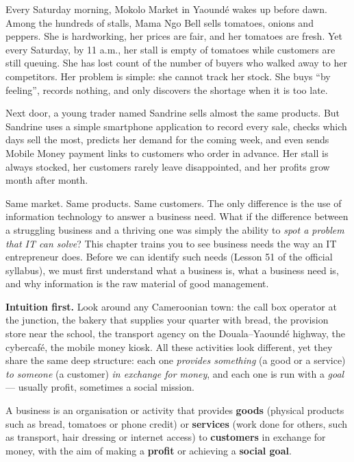 \documentclass[11pt]{article}
\newcommand{\cle}[1]{{\popxbold\color{popdark}#1}}
\newcounter{popsec}
\newcounter{popsub}
\newcommand{\courssub}[1]{%
  \stepcounter{popsub}%
  \par\vspace{9pt}\noindent{\popxbold\fontsize{11.5}{13}\selectfont\color{popink}{\color{poporange}\thepopsec.\thepopsub}\hspace{6pt}#1}\par\nopagebreak\vspace{4pt}
}
\begin{document}
Every Saturday morning, Mokolo Market in Yaoundé wakes up before dawn. Among the hundreds of stalls, Mama Ngo Bell sells tomatoes, onions and peppers. She is hardworking, her prices are fair, and her tomatoes are fresh. Yet every Saturday, by 11 a.m., her stall is empty of tomatoes while customers are still queuing. She has lost count of the number of buyers who walked away to her competitors. Her problem is simple: she cannot track her stock. She buys ``by feeling'', records nothing, and only discovers the shortage when it is too late.

Next door, a young trader named Sandrine sells almost the same products. But Sandrine uses a simple smartphone application to record every sale, checks which days sell the most, predicts her demand for the coming week, and even sends Mobile Money payment links to customers who order in advance. Her stall is always stocked, her customers rarely leave disappointed, and her profits grow month after month.

Same market. Same products. Same customers. The only difference is the \cle{use of information technology} to answer a business need. What if the difference between a struggling business and a thriving one was simply the ability to \emph{spot a problem that IT can solve}? This chapter trains you to see business needs the way an IT entrepreneur does. Before we can identify such needs (Lesson 51 of the official syllabus), we must first understand what a business is, what a business need is, and why information is the raw material of good management.

\courssub{What Is a Business?}

\textbf{Intuition first.} Look around any Cameroonian town: the call box operator at the junction, the bakery that supplies your quarter with bread, the provision store near the school, the transport agency on the Douala--Yaoundé highway, the cybercafé, the mobile money kiosk. All these activities look different, yet they share the same deep structure: each one \emph{provides something} (a good or a service) \emph{to someone} (a customer) \emph{in exchange for money}, and each one is run with a \emph{goal} — usually profit, sometimes a social mission.

\begin{definition}[Business]
A \cle{business} is an organisation or activity that provides \textbf{goods} (physical products such as bread, tomatoes or phone credit) or \textbf{services} (work done for others, such as transport, hair dressing or internet access) to \textbf{customers} in exchange for money, with the aim of making a \textbf{profit} or achieving a \textbf{social goal}.
\end{definition}
\end{document}
